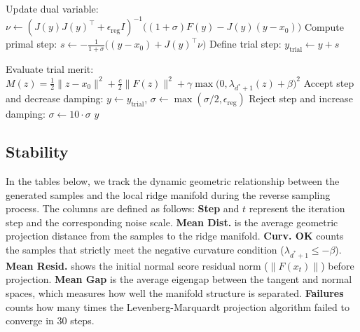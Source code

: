 \documentclass[11pt]{article}
\begin{document}
\begin{algorithm}[tb]
\begin{algorithmic}[1]
    \State {}
    \State Update dual variable: $\nu \leftarrow (J(y) J(y)^\intercal + \epsilon_{\text{reg}} I)^{-1} \big((1+\sigma)F(y) - J(y)(y-x_0)\big)$
    \State Compute primal step: $s \leftarrow -\frac{1}{1+\sigma} \big((y - x_0) + J(y)^\intercal \nu\big)$
    \State Define trial step: $y_{\text{trial}} \leftarrow y + s$
    
    \State {}
    \State Evaluate trial merit: $M(z) = \frac{1}{2}\|z-x_0\|^2 + \frac{c}{2}\|F(z)\|^2 + \gamma \max\big(0, \lambda_{d^*+1}(z) + \beta\big)^2$
        \State Accept step and decrease damping: $y \leftarrow y_{\text{trial}}$, $\sigma \leftarrow \max(\sigma / 2, \epsilon_{\text{reg}})$
    \Else
        \State Reject step and increase damping: $\sigma \leftarrow 10 \cdot \sigma$
    \EndIf
\EndFor
\State \Return $y$ 
\end{algorithmic}
\end{algorithm}


\clearpage
\subsection{Stability}\label{sec:stability}
In the tables below, we track the dynamic geometric relationship between the generated samples and the local ridge manifold during the reverse sampling process. The columns are defined as follows: \textbf{Step} and $t$ represent the iteration step and the corresponding noise scale. \textbf{Mean Dist.} is the average geometric projection distance from the samples to the ridge manifold. \textbf{Curv. OK} counts the samples that strictly meet the negative curvature condition ($\lambda_{d^*+1} \le -\beta$). \textbf{Mean Resid.} shows the initial normal score residual norm ($\|F(x_t)\|$) before projection. \textbf{Mean Gap} is the average eigengap between the tangent and normal spaces, which measures how well the manifold structure is separated. \textbf{Failures} counts how many times the Levenberg-Marquardt projection algorithm failed to converge in 30 steps.
\end{document}

